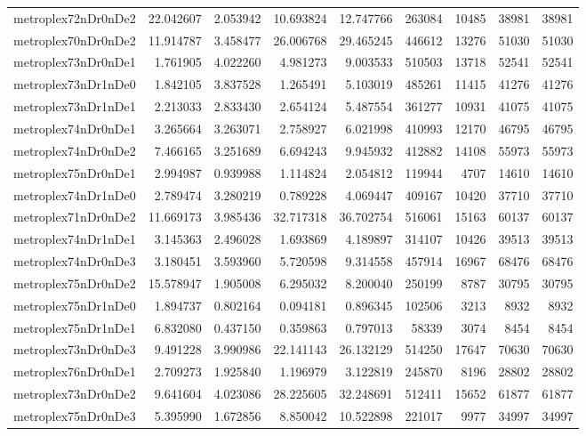 \documentclass[../../../thesis.tex]{subfiles}
\begin{document}
\begin{longtable}{|l|r|r|r|r|r|r|r|r|}
metroplex72nDr0nDe2 & 22.042607 & 2.053942 & 10.693824 & 12.747766 & 263084 & 10485 & 38981 & 38981 \\
metroplex70nDr0nDe2 & 11.914787 & 3.458477 & 26.006768 & 29.465245 & 446612 & 13276 & 51030 & 51030 \\
metroplex73nDr0nDe1 & 1.761905 & 4.022260 & 4.981273 & 9.003533 & 510503 & 13718 & 52541 & 52541 \\
metroplex73nDr1nDe0 & 1.842105 & 3.837528 & 1.265491 & 5.103019 & 485261 & 11415 & 41276 & 41276 \\
metroplex73nDr1nDe1 & 2.213033 & 2.833430 & 2.654124 & 5.487554 & 361277 & 10931 & 41075 & 41075 \\
metroplex74nDr0nDe1 & 3.265664 & 3.263071 & 2.758927 & 6.021998 & 410993 & 12170 & 46795 & 46795 \\
metroplex74nDr0nDe2 & 7.466165 & 3.251689 & 6.694243 & 9.945932 & 412882 & 14108 & 55973 & 55973 \\
metroplex75nDr0nDe1 & 2.994987 & 0.939988 & 1.114824 & 2.054812 & 119944 & 4707 & 14610 & 14610 \\
metroplex74nDr1nDe0 & 2.789474 & 3.280219 & 0.789228 & 4.069447 & 409167 & 10420 & 37710 & 37710 \\
metroplex71nDr0nDe2 & 11.669173 & 3.985436 & 32.717318 & 36.702754 & 516061 & 15163 & 60137 & 60137 \\
metroplex74nDr1nDe1 & 3.145363 & 2.496028 & 1.693869 & 4.189897 & 314107 & 10426 & 39513 & 39513 \\
metroplex74nDr0nDe3 & 3.180451 & 3.593960 & 5.720598 & 9.314558 & 457914 & 16967 & 68476 & 68476 \\
metroplex75nDr0nDe2 & 15.578947 & 1.905008 & 6.295032 & 8.200040 & 250199 & 8787 & 30795 & 30795 \\
metroplex75nDr1nDe0 & 1.894737 & 0.802164 & 0.094181 & 0.896345 & 102506 & 3213 & 8932 & 8932 \\
metroplex75nDr1nDe1 & 6.832080 & 0.437150 & 0.359863 & 0.797013 & 58339 & 3074 & 8454 & 8454 \\
metroplex73nDr0nDe3 & 9.491228 & 3.990986 & 22.141143 & 26.132129 & 514250 & 17647 & 70630 & 70630 \\
metroplex76nDr0nDe1 & 2.709273 & 1.925840 & 1.196979 & 3.122819 & 245870 & 8196 & 28802 & 28802 \\
metroplex73nDr0nDe2 & 9.641604 & 4.023086 & 28.225605 & 32.248691 & 512411 & 15652 & 61877 & 61877 \\
metroplex75nDr0nDe3 & 5.395990 & 1.672856 & 8.850042 & 10.522898 & 221017 & 9977 & 34997 & 34997 \\

\end{longtable}
\end{document}
